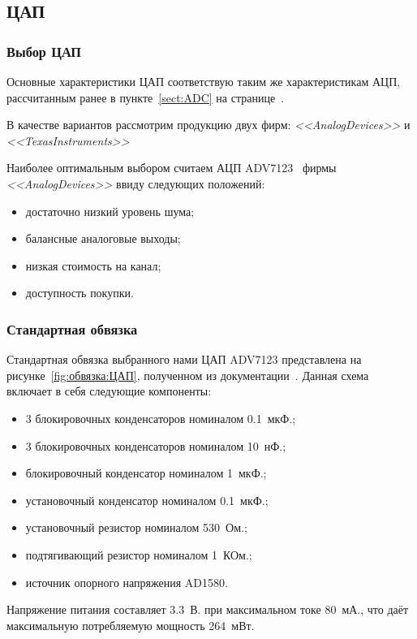 \documentclass[utf8x, 14pt, oneside, a4paper]{article}
\begin{document}
		\subsection{ЦАП}
			\subsubsection{Выбор ЦАП}
				Основные характеристики ЦАП соответствую таким же характеристикам АЦП, рассчитанным ранее в пункте~\ref{sect:ADC} на странице~\pageref{sect:ADC}. 
				
				В качестве вариантов рассмотрим продукцию двух фирм: \textit{<<AnalogDevices>>} и \textit{<<TexasInstruments>>}
				
			
				
				Наиболее оптимальным выбором считаем АЦП ADV7123~\cite{bib:ЦАП} фирмы \textit{<<AnalogDevices>>} ввиду следующих положений:
				\begin{itemize}
					\item достаточно низкий уровень шума;
					\item балансные аналоговые выходы;
					\item низкая стоимость на канал;
					\item доступность покупки.
				\end{itemize}
				
			\subsubsection{Стандартная обвязка}
				Стандартная обвязка выбранного нами ЦАП ADV7123 представлена на рисунке~\ref{fig:обвязка:ЦАП}, полученном из документации~\cite{bib:ЦАП}. Данная схема включает в себя следующие компоненты:
				\begin{itemize}
					\item 3 блокировочных конденсаторов номиналом 0.1~мкФ.;
					\item 3 блокировочных конденсаторов номиналом 10~нФ.;
					\item блокировочный конденсатор номиналом 1~мкФ.;
					\item установочный конденсатор номиналом 0.1~мкФ.;
					\item установочный резистор номиналом 530~Ом.;
					\item подтягивающий резистор номиналом 1~КОм.;
					\item источник опорного напряжения AD1580.
				\end{itemize}
			
				Напряжение питания составляет 3.3~В. при максимальном токе 80~мА., что даёт максимальную потребляемую мощность 264~мВт.
				
\end{document}
